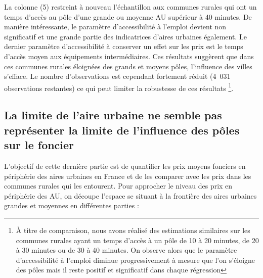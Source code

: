 \documentclass[10.5pt,a4paper]{article}
\begin{document}
{La colonne (5) restreint à nouveau l'échantillon aux communes rurales qui ont un temps d'accès au pôle d'une grande ou moyenne AU supérieur à 40 minutes. De manière intéressante, le paramètre d'accessibilité à l'emploi devient non significatif et une grande partie des indicatrices d'aires urbaines également. Le dernier paramètre d'accessibilité à conserver un effet sur les prix est le temps d'accès moyen aux équipements intermédiaires. Ces résultats suggèrent que dans ces communes rurales éloignées des grands et moyens pôles, l'influence des villes s'efface. Le nombre d'observations est cependant fortement réduit (4~031 observations restantes) ce qui peut limiter la robustesse de ces résultats \footnote{\`{A} titre de comparaison, nous avons réalisé des estimations similaires sur les communes rurales ayant un temps d'accès à un pôle de 10 à 20 minutes, de 20 à 30 minutes ou de 30 à 40 minutes. On observe alors que le paramètre d'accessibilité à l'emploi diminue progressivement à mesure que l'on s'éloigne des pôles mais il reste positif et significatif dans chaque régression}. \par  

%

\subsection{La limite de l'aire urbaine ne semble pas représenter la limite de l'influence des pôles sur le foncier}
 
L'objectif de cette dernière partie est de quantifier les prix moyens fonciers en périphérie des aires urbaines en France et de les comparer avec les prix dans les communes rurales qui les entourent.  Pour approcher le niveau des prix en périphérie des AU, on découpe l'espace se situant à la frontière des aires urbaines grandes et moyennes en différentes parties : \par

}
\end{document}
